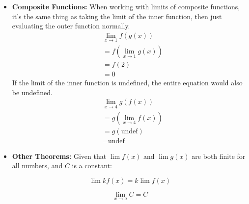 \documentclass[12pt]{article}
\begin{document}
\begin{itemize}
                \item \textbf{Composite Functions:}
                    \newline
                    When working with limits of composite functions, it's the same thing as taking the limit of the inner function, then just evaluating the outer function normally.
                    \begin{align*}
                        &\lim_{x \to 1} f\left(g(x)\right) \\
                        &= f\left( \lim_{x \to 1} g(x) \right) \\
                        &= f(2) \\
                        &= 0
                    \end{align*}
                    \newline
                    If the limit of the inner function is undefined, the entire equation would also be undefined.
                    \newline
                    \begin{align*}
                        &\lim_{x \to 4} g\left( f(x) \right) \\
                        &= g\left( \lim_{x \to 4} f(x) \right) \\
                        &= g(\text{undef}) \\
                        &= \text{undef}
                    \end{align*}
                \item \textbf{Other Theorems:}
                    \newline
                    Given that $\lim f(x)$ and $\lim g(x)$ are both finite
                    for all numbers, and $C$ is a constant:
                    \newline
                    \noindent \begin{minipage}{0.5\linewidth}
                        \[ \lim k f(x) = k \lim f(x) \]
                    \end{minipage}%
                    \begin{minipage}{0.5\linewidth}
                        \[ \lim_{x \to a} C = C \]
                    \end{minipage}
            \end{itemize}
\end{document}
